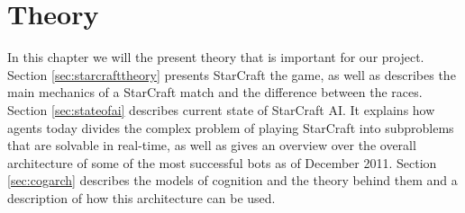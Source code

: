 
\chapter{Theory}
In this chapter we will the present theory that is important for our project.
Section \ref{sec:starcrafttheory} presents StarCraft the game, as well as
describes the main mechanics of a StarCraft match and the difference between the
races. Section \ref{sec:stateofai} describes current state of StarCraft AI. It
explains how agents today divides the complex problem of playing StarCraft into
subproblems that are solvable in real-time, as well as gives an overview over
the overall architecture of some of the most successful bots as of December
2011. Section \ref{sec:cogarch} describes the models of cognition and the theory
behind them and a description of how this architecture can be used. 



